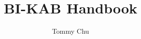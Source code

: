 \documentclass[a4paper]{article}
\title{BI-KAB Handbook}
\author{Tommy Chu}
\date{}
\begin{document}
\twocolumn
\maketitle
\tableofcontents


\end{document}
